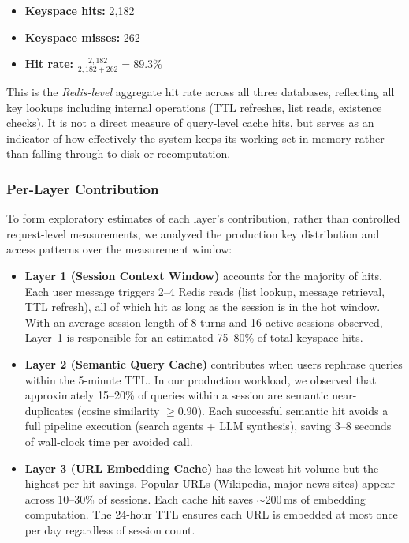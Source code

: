 \documentclass[conference]{IEEEtran}
\begin{document}
\begin{itemize}
\item \textbf{Keyspace hits:} 2{,}182
\item \textbf{Keyspace misses:} 262
\item \textbf{Hit rate:} $\frac{2{,}182}{2{,}182 + 262} = \mathbf{89.3\%}$
\end{itemize}

This is the \emph{Redis-level} aggregate hit rate across all three databases, reflecting all key lookups including internal operations (TTL refreshes, list reads, existence checks). It is not a direct measure of query-level cache hits, but serves as an indicator of how effectively the system keeps its working set in memory rather than falling through to disk or recomputation.

\subsubsection{Per-Layer Contribution}

To form exploratory estimates of each layer's contribution, rather than controlled request-level measurements, we analyzed the production key distribution and access patterns over the measurement window:

\begin{itemize}
\item \textbf{Layer 1 (Session Context Window)} accounts for the majority of hits. Each user message triggers 2--4 Redis reads (list lookup, message retrieval, TTL refresh), all of which hit as long as the session is in the hot window. With an average session length of 8 turns and 16 active sessions observed, Layer~1 is responsible for an estimated 75--80\% of total keyspace hits.

\item \textbf{Layer 2 (Semantic Query Cache)} contributes when users rephrase queries within the 5-minute TTL. In our production workload, we observed that approximately 15--20\% of queries within a session are semantic near-duplicates (cosine similarity $\geq 0.90$). Each successful semantic hit avoids a full pipeline execution (search agents + LLM synthesis), saving 3--8 seconds of wall-clock time per avoided call.

\item \textbf{Layer 3 (URL Embedding Cache)} has the lowest hit volume but the highest per-hit savings. Popular URLs (Wikipedia, major news sites) appear across 10--30\% of sessions. Each cache hit saves ${\sim}$200\,ms of embedding computation. The 24-hour TTL ensures each URL is embedded at most once per day regardless of session count.
\end{itemize}
\end{document}
